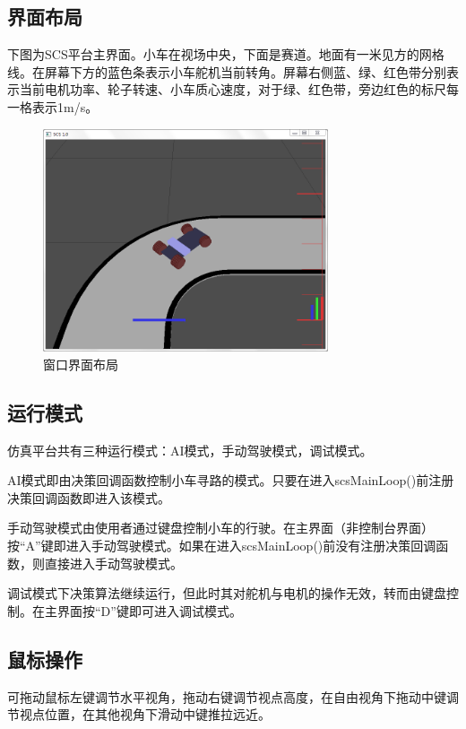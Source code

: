 \documentclass[titlepage,a4paper]{ctexart}
\begin{document}
\subsection{界面布局}
下图为SCS平台主界面。小车在视场中央，下面是赛道。地面有一米见方的网格线。在屏幕下方的蓝色条表示小车舵机当前转角。屏幕右侧蓝、绿、红色带分别表示当前电机功率、轮子转速、小车质心速度，对于绿、红色带，旁边红色的标尺每一格表示1m/s。
\begin{figure}[!htbp]
\centering
\includegraphics[width=0.75\textwidth]{window.png}
\caption{窗口界面布局}
\end{figure}
\subsection{运行模式}
仿真平台共有三种运行模式：AI模式，手动驾驶模式，调试模式。

AI模式即由决策回调函数控制小车寻路的模式。只要在进入scsMainLoop()前注册决策回调函数即进入该模式。

手动驾驶模式由使用者通过键盘控制小车的行驶。在主界面（非控制台界面）按“A”键即进入手动驾驶模式。如果在进入scsMainLoop()前没有注册决策回调函数，则直接进入手动驾驶模式。

调试模式下决策算法继续运行，但此时其对舵机与电机的操作无效，转而由键盘控制。在主界面按“D”键即可进入调试模式。

\subsection{鼠标操作}
可拖动鼠标左键调节水平视角，拖动右键调节视点高度，在自由视角下拖动中键调节视点位置，在其他视角下滑动中键推拉远近。
\end{document}
